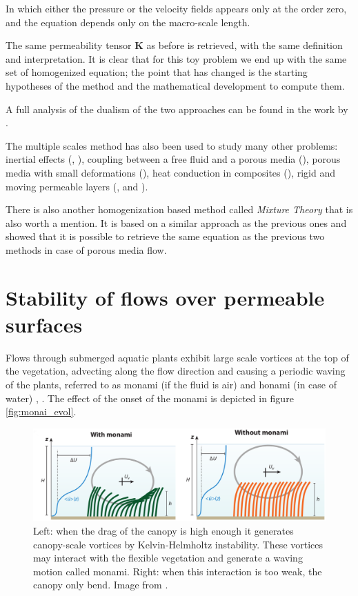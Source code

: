 In which either the pressure or the velocity fields appears only at the order zero, and the equation depends only on the macro-scale length.

The same permeability tensor $\mathbf{K}$ as before is retrieved, with the same definition and interpretation.
It is clear that for this toy problem we end up with the same set of homogenized equation; the point that has changed is the starting hypotheses of the method and the mathematical development to compute them.

A full analysis of the dualism of the two approaches can be found in the work by \citet{davit2013homogenization}.

The multiple scales method has also been used to study many other problems: inertial effects (\citet{mei1991effect}, \citet{skjetne1999new}), coupling between a free fluid and a porous media (\citet{mikelic2000interface}), porous media with small deformations (\citet{auriault1977etude}), heat conduction in composites (\citet{auriault1983effective}), rigid and moving permeable layers (\citet{zampogna2016fluid}, \citet{ugis} and \citet{zampogna2017pelskin}).

There is also another homogenization based method called \textit{Mixture Theory} that is also worth a mention.
It is based on a similar approach as the previous ones and \citet{rajagopal2007hierarchy} showed that it is possible to retrieve the same equation as the previous two methods in case of porous media flow.


\section{Stability of flows over permeable surfaces}
\label{sec:stability}

Flows through submerged aquatic plants exhibit large scale vortices at the top of the vegetation,
advecting along the flow direction and causing a periodic waving of the plants, referred to as
monami (if the fluid is air) and honami (in case of water) \citet{inoue1955studies}, \citet{ackerman1993reduced}.
The effect of the onset of the monami is depicted in figure \ref{fig:monai_evol}.

\begin{figure}[h]
	\centering
	\includegraphics[width=1\linewidth]{chapter_1/monami}
	\caption{Left: when the drag of the canopy is high enough it generates canopy-scale vortices by Kelvin-Helmholtz instability. These vortices may interact with the flexible vegetation and generate a waving motion called monami. Right: when this interaction is too weak, the canopy only bend. Image from \citet{nepf2012flow}.}
	\label{fig:monami}
\end{figure}

